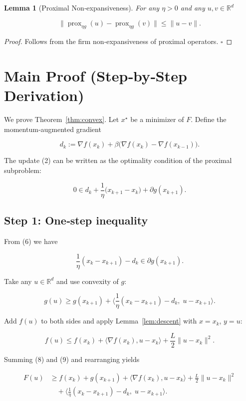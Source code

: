 \documentclass{article}
\newtheorem{lemma}{Lemma}
\begin{document}
\begin{lemma}[Proximal Non‑expansiveness]\label{lem:prox}
For any $\eta>0$ and any $u,v\in\mathbb{R}^d$  

\[
\bigl\|\operatorname{prox}_{\eta g}(u)-\operatorname{prox}_{\eta g}(v)\bigr\|\le \|u-v\|. \tag{L2}
\]
\end{lemma}
\begin{proof}
Follows from the firm non‑expansiveness of proximal operators. \hfill $\square$
\end{proof}

\section*{Main Proof (Step‑by‑Step Derivation)}
We prove Theorem~\ref{thm:convex}.  
Let $x^\star$ be a minimizer of $F$.  
Define the momentum‑augmented gradient  

\[
d_k:=\nabla f(x_k)+\beta\bigl(\nabla f(x_k)-\nabla f(x_{k-1})\bigr). \tag{5}
\]

The update (2) can be written as the optimality condition of the proximal subproblem:

\[
0\in d_k +\frac{1}{\eta}\bigl(x_{k+1}-x_k\bigr)+\partial g(x_{k+1}). \tag{6}
\]

\subsection*{Step 1: One‑step inequality}
From (6) we have  

\[
\frac{1}{\eta}(x_k-x_{k+1})-d_k\in\partial g(x_{k+1}). \tag{7}
\]

Take any $u\in\mathbb{R}^d$ and use convexity of $g$:

\[
g(u)\ge g(x_{k+1})+\Big\langle \frac{1}{\eta}(x_k-x_{k+1})-d_k,\;u-x_{k+1}\Big\rangle . \tag{8}
\]

Add $f(u)$ to both sides and apply Lemma~\ref{lem:descent} with $x=x_k$, $y=u$:

\[
f(u)\le f(x_k)+\langle\nabla f(x_k),u-x_k\rangle+\frac{L}{2}\|u-x_k\|^2. \tag{9}
\]

Summing (8) and (9) and rearranging yields  

\[
\begin{aligned}
F(u) &\ge f(x_k)+g(x_{k+1})+\langle\nabla f(x_k),u-x_k\rangle+\frac{L}{2}\|u-x_k\|^2 \\
&\quad +\Big\langle\frac{1}{\eta}(x_k-x_{k+1})-d_k,\;u-x_{k+1}\Big\rangle . \tag{10}
\end{aligned}
\]
\end{document}
